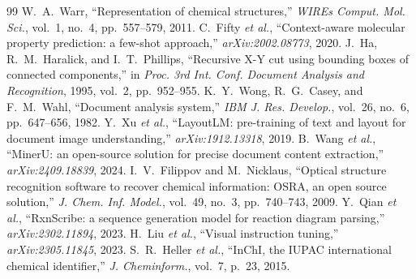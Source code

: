 \documentclass[conference]{IEEEtran}
\begin{document}
\begin{thebibliography}{99}
 W.~A.~Warr, ``Representation of chemical structures,'' \textit{WIREs Comput. Mol. Sci.}, vol.~1, no.~4, pp.~557--579, 2011.
 C.~Fifty \textit{et al.}, ``Context-aware molecular property prediction: a few-shot approach,'' \textit{arXiv:2002.08773}, 2020.
 J.~Ha, R.~M.~Haralick, and I.~T.~Phillips, ``Recursive X-Y cut using bounding boxes of connected components,'' in \textit{Proc. 3rd Int. Conf. Document Analysis and Recognition}, 1995, vol.~2, pp.~952--955.
 K.~Y.~Wong, R.~G.~Casey, and F.~M.~Wahl, ``Document analysis system,'' \textit{IBM J. Res. Develop.}, vol.~26, no.~6, pp.~647--656, 1982.
 Y.~Xu \textit{et al.}, ``LayoutLM: pre-training of text and layout for document image understanding,'' \textit{arXiv:1912.13318}, 2019.
 B.~Wang \textit{et al.}, ``MinerU: an open-source solution for precise document content extraction,'' \textit{arXiv:2409.18839}, 2024.
 I.~V.~Filippov and M.~Nicklaus, ``Optical structure recognition software to recover chemical information: OSRA, an open source solution,'' \textit{J. Chem. Inf. Model.}, vol.~49, no.~3, pp.~740--743, 2009.
 Y.~Qian \textit{et al.}, ``RxnScribe: a sequence generation model for reaction diagram parsing,'' \textit{arXiv:2302.11894}, 2023.
 H.~Liu \textit{et al.}, ``Visual instruction tuning,'' \textit{arXiv:2305.11845}, 2023.
 S.~R.~Heller \textit{et al.}, ``InChI, the IUPAC international chemical identifier,'' \textit{J. Cheminform.}, vol.~7, p.~23, 2015.
\end{thebibliography}
\end{document}
